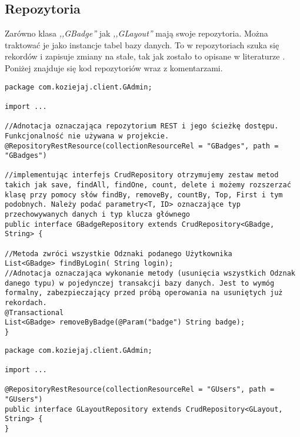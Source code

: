 \documentclass[a4paper,12pt,twoside,openany]{report}
\begin{document}
\subsection{Repozytoria}
Zarówno klasa \textit{,,GBadge''} jak \textit{,,GLayout''} mają swoje repozytoria. Można traktować je jako instancje tabel bazy danych. To w repozytoriach szuka się rekordów i zapisuje zmiany na stałe, tak jak zostało to opisane w literaturze \cite{Spring}. Poniżej znajduje się kod repozytoriów wraz z komentarzami.
\begin{lstlisting}
package com.koziejaj.client.GAdmin;

import ...

//Adnotacja oznaczająca repozytorium REST i jego ścieżkę dostępu. Funkcjonalność nie używana w projekcie.
@RepositoryRestResource(collectionResourceRel = "GBadges", path = "GBadges")

//implementując interfejs CrudRepository otrzymujemy zestaw metod takich jak save, findAll, findOne, count, delete i możemy rozszerzać klasę przy pomocy słów findBy, removeBy, countBy, Top, First i tym podobnych. Należy podać parametry<T, ID> oznaczające typ przechowywanych danych i typ klucza głównego
public interface GBadgeRepository extends CrudRepository<GBadge, String> {

//Metoda zwróci wszystkie Odznaki podanego Użytkownika
List<GBadge> findByLogin( String login);
//Adnotacja oznaczająca wykonanie metody (usunięcia wszystkich Odznak danego typu) w pojedynczej transakcji bazy danych. Jest to wymóg formalny, zabezpieczający przed próbą operowania na usuniętych już rekordach.
@Transactional
List<GBadge> removeByBadge(@Param("badge") String badge);
}
\end{lstlisting}

\begin{lstlisting}
package com.koziejaj.client.GAdmin;

import ...

@RepositoryRestResource(collectionResourceRel = "GUsers", path = "GUsers")
public interface GLayoutRepository extends CrudRepository<GLayout, String> {
}

\end{lstlisting}
\end{document}
